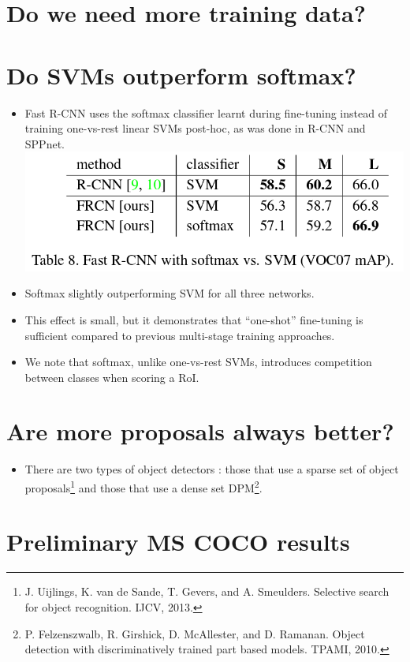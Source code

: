 \documentclass[11pt]{book}
\begin{document}
\section{Do we need more training data?}
\label{sec-1-4-3}
\section{Do SVMs outperform softmax?}
\label{sec-1-4-4}


\begin{itemize}
\item Fast R-CNN uses the softmax classifier learnt during fine-tuning instead of
      training one-vs-rest linear SVMs post-hoc, as was done in R-CNN and SPPnet.
      \includegraphics[width=.9\linewidth]{./pic_fast_rcnn/table8.png}
\item Softmax slightly outperforming SVM for all three networks.
\item This effect is small, but it demonstrates that ``one-shot'' fine-tuning is sufficient
      compared to previous multi-stage training approaches.
\item We note that softmax, unlike one-vs-rest SVMs, introduces competition between classes
      when scoring a RoI.
\end{itemize}
\section{Are more proposals always better?}
\label{sec-1-4-5}


\begin{itemize}
\item There are two types of object detectors : those that use a sparse set of object 
      proposals\footnote{J. Uijlings, K. van de Sande, T. Gevers, and A. Smeulders.
Selective search for object recognition.
IJCV, 2013.
 } and those that use a dense set DPM\footnote{P.  Felzenszwalb,  R.  Girshick,  D.  McAllester,  and  D.  Ramanan.   
Object detection with discriminatively trained part based models.
TPAMI, 2010.
 }.
\end{itemize}
\section{Preliminary MS COCO results}
\label{sec-1-4-6}
\end{document}
